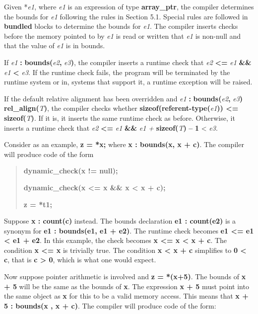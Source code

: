 \documentclass[]{article}
\begin{document}
Given *\emph{e1}, where \emph{e1} is an expression of type
\textbf{array\_ptr}, the compiler determines the bounds for \emph{e1}
following the rules in Section 5.1. Special rules are followed in
\textbf{bundled} blocks to determine the bounds for \emph{e1}. The
compiler inserts checks before the memory pointed to by \emph{e1} is
read or written that \emph{e1} is non-null and that the value of
\emph{e1} is in bounds.

If \emph{e1} \textbf{:} \textbf{bounds(}\emph{e2}\textbf{,}
\emph{e3}\textbf{)}, the compiler inserts a runtime check that \emph{e2}
\textbf{\textless{}=} \emph{e1} \textbf{\&\&} \emph{e1}
\textbf{\textless{}} \emph{e3}. If the runtime check fails, the program
will be terminated by the runtime system or in, systems that support it,
a runtime exception will be raised.

If the default relative alignment has been overridden and \emph{e1}
\textbf{:} \textbf{bounds(}\emph{e2}\textbf{,} \emph{e3}\textbf{)
rel\_align(}\emph{T}\textbf{)}, the compiler checks whether
\textbf{sizeof(referent-type(}\emph{e1}\textbf{)) \textless{}=}
\textbf{sizeof(}\emph{T}\textbf{)}. If it is, it inserts the same
runtime check as before. Otherwise, it inserts a runtime check that
\emph{e2} \textbf{\textless{}=} \emph{e1} \textbf{\&\&} \emph{e1 +}
\textbf{sizeof(}\emph{T}\textbf{)} \textbf{--} \textbf{1} \textless{}
\emph{e3}.

Consider as an example, \textbf{z = *x;} where \textbf{x : bounds(x, x +
c)}. The compiler will produce code of the form

\begin{quote}
\textbf{dynamic\_check(x != null);}

\textbf{dynamic\_check(x \textless{}= x \&\& x \textless{} x + c);}

\textbf{z = *t1;}
\end{quote}

Suppose \textbf{x : count(c)} instead. The bounds declaration \textbf{e1
: count(e2)} is a synonym for \textbf{e1 : bounds(e1, e1 + e2)}. The
runtime check becomes \textbf{e1 \textless{}= e1 \textless{} e1 + e2}.
In this example, the check becomes \textbf{x \textless{}= x \textless{}
x + c}. The condition \textbf{x \textless{}= x} is trivially true. The
condition \textbf{x \textless{} x + c} simplifies to \textbf{0
\textless{} c}, that is \textbf{c \textgreater{} 0}, which is what one
would expect.

Now suppose pointer arithmetic is involved and \textbf{z = *(x+5)}. The
bounds of \textbf{x + 5} will be the same as the bounds of \textbf{x}.
The expression \textbf{x + 5} must point into the same object as
\textbf{x} for this to be a valid memory access. This means that
\textbf{x + 5 : bounds(x , x + c)}. The compiler will produce code of
the form:
\end{document}
